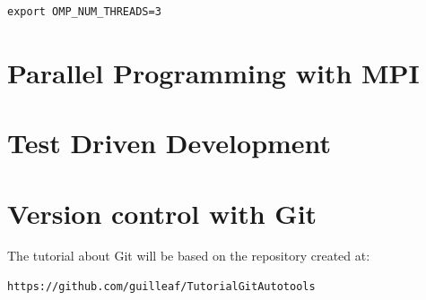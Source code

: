 \begin{lstlisting}
export OMP_NUM_THREADS=3
\end{lstlisting}


\section{Parallel Programming with MPI}


\section{Test Driven Development}


\section{Version control with Git}

The tutorial about Git will be based on the repository created at:

\begin{lstlisting}
https://github.com/guilleaf/TutorialGitAutotools
\end{lstlisting}



